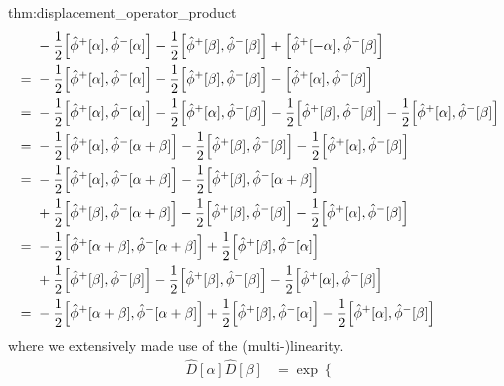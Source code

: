 \begin{delayedproof}{thm:displacement_operator_product}
\begin{equation*}
		\begin{split}
			&\
			-
			\frac{1}{2}
			\comm{\hat\phi^+[\alpha]}{\hat\phi^-[\alpha]}
			-
			\frac{1}{2}
			\comm{\hat\phi^+[\beta]}{\hat\phi^-[\beta]}
			+
			\comm{\hat\phi^+[-\alpha]}{\hat\phi^-[\beta]}
			\\
			=&\
			-
			\frac{1}{2}
			\comm{\hat\phi^+[\alpha]}{\hat\phi^-[\alpha]}
			-
			\frac{1}{2}
			\comm{\hat\phi^+[\beta]}{\hat\phi^-[\beta]}
			-
			\comm{\hat\phi^+[\alpha]}{\hat\phi^-[\beta]}
			\\
			=&\
			-
			\frac{1}{2}
			\comm{\hat\phi^+[\alpha]}{\hat\phi^-[\alpha]}
			-
			\frac{1}{2}
			\comm{\hat\phi^+[\alpha]}{\hat\phi^-[\beta]}
			-
			\frac{1}{2}
			\comm{\hat\phi^+[\beta]}{\hat\phi^-[\beta]}
			-
			\frac{1}{2}
			\comm{\hat\phi^+[\alpha]}{\hat\phi^-[\beta]}
			\\
			=&\
			-
			\frac{1}{2}
			\comm{\hat\phi^+[\alpha]}{\hat\phi^-[\alpha+\beta]}
			-
			\frac{1}{2}
			\comm{\hat\phi^+[\beta]}{\hat\phi^-[\beta]}
			-
			\frac{1}{2}
			\comm{\hat\phi^+[\alpha]}{\hat\phi^-[\beta]}
			\\
			=&\
			-
			\frac{1}{2}
			\comm{\hat\phi^+[\alpha]}{\hat\phi^-[\alpha+\beta]}
			-
			\frac{1}{2}
			\comm{\hat\phi^+[\beta]}{\hat\phi^-[\alpha+\beta]}
			\\
			&\
			+
			\frac{1}{2}
			\comm{\hat\phi^+[\beta]}{\hat\phi^-[\alpha+\beta]}
			-
			\frac{1}{2}
			\comm{\hat\phi^+[\beta]}{\hat\phi^-[\beta]}
			-
			\frac{1}{2}
			\comm{\hat\phi^+[\alpha]}{\hat\phi^-[\beta]}
			\\
			=&\
			-
			\frac{1}{2}
			\comm{\hat\phi^+[\alpha+\beta]}{\hat\phi^-[\alpha+\beta]}
			+
			\frac{1}{2}
			\comm{\hat\phi^+[\beta]}{\hat\phi^-[\alpha]}
			\\
			&\
			+
			\frac{1}{2}
			\comm{\hat\phi^+[\beta]}{\hat\phi^-[\beta]}
			-
			\frac{1}{2}
			\comm{\hat\phi^+[\beta]}{\hat\phi^-[\beta]}
			-
			\frac{1}{2}
			\comm{\hat\phi^+[\alpha]}{\hat\phi^-[\beta]}
			\\
			=&\
			-
			\frac{1}{2}
			\comm{\hat\phi^+[\alpha+\beta]}{\hat\phi^-[\alpha+\beta]}
			+
			\frac{1}{2}
			\comm{\hat\phi^+[\beta]}{\hat\phi^-[\alpha]}
			-
			\frac{1}{2}
			\comm{\hat\phi^+[\alpha]}{\hat\phi^-[\beta]}
		\end{split}
	\end{equation*}
	where we extensively made use of the (multi-)linearity.
	\begin{equation*}
		\begin{split}
			\hat{D}[\alpha]
			\hat{D}[\beta]
			&=
			\exp\left\{

\end{split}
\end{equation*}
\end{delayedproof}

